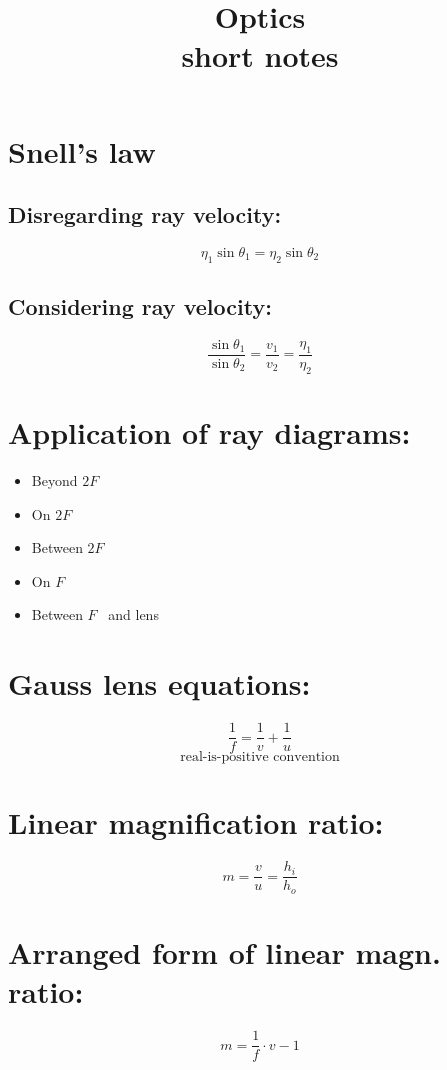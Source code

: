 \documentclass[11pt]{article}
\title{Optics\\
\large short notes
}
\date{}
\begin{document}
	
\section{Snell's law}
	\subsection{Disregarding ray velocity:}
	 	\[\eta_1\sin\theta_1 = \eta_2\sin\theta_2\]
	 
	\subsection{Considering ray velocity:}
 	 	\[\frac{\sin\theta_1}{\sin\theta_2} = \frac{v_1}{v_2} = \frac{\eta_1}{\eta_2}\]
 	 
\section{Application of ray diagrams:}
 	 
 	 \begin{itemize}
 	 	\item{Beyond $2F$}
 	 	\item{On $2F$}
		\item{Between $2F$}
		\item{On $F$}
		\item{Between $F$ \ and lens}
 	 \end{itemize}
  
\section{Gauss lens equations:}
			\[\frac{1}{f}=\frac{1}{v}+\frac{1}{u}\]
			\[\text{real-is-positive convention}\]

\section{Linear magnification ratio:}

			\[m=\frac{v}{u}=\frac{h_i}{h_o}\]
			
\section{Arranged form of linear magn. ratio:}
			\[m=\frac{1}{f}\cdot v - 1\]
			
\end{document}
